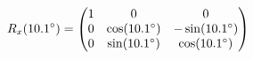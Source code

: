 \documentclass[preview]{standalone}
\begin{document}
\begin{align*}
\special{dvisvgm:raw <g id='unique000'>}R_x(10.1^\circ) = \begin{pmatrix} 1 & 0 & 0 \\ 0 & \cos(10.1^\circ) & -\sin(10.1^\circ) \\ 0 & \sin(10.1^\circ) & \cos(10.1^\circ) \end{pmatrix}\special{dvisvgm:raw </g>}
\end{align*}
\end{document}
